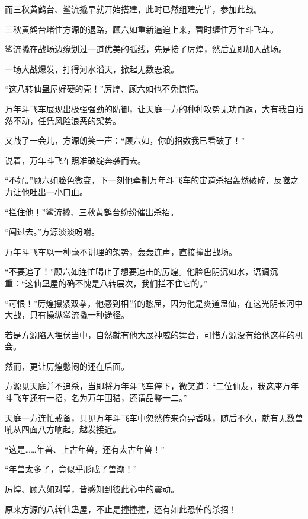 \begin{this_body}
而三秋黄鹤台、鲨流撬早就开始搭建，此时已然组建完毕，参加此战。

三秋黄鹤台堵住方源的退路，顾六如重新逼迫上来，暂时缠住万年斗飞车。

鲨流撬在战场边缘划过一道优美的弧线，先是接了厉煌，然后立即加入战场。

一场大战爆发，打得河水滔天，掀起无数恶浪。

“这八转仙蛊屋好硬的壳！”厉煌、顾六如也不免惊愕。

万年斗飞车展现出极强强劲的防御，让天庭一方的种种攻势无功而返，大有我自岿然不动，任凭风险浪恶的架势。

又战了一会儿，方源朗笑一声：“顾六如，你的招数我已看破了！”

说着，万年斗飞车照准破绽奔袭而去。

“不好。”顾六如脸色微变，下一刻他牵制万年斗飞车的宙道杀招轰然破碎，反噬之力让他吐出一小口血。

“拦住他！”鲨流撬、三秋黄鹤台纷纷催出杀招。

“闯过去。”方源淡淡吩咐。

万年斗飞车以一种毫不讲理的架势，轰轰连声，直接撞出战场。

“不要追了！”顾六如连忙喝止了想要追击的厉煌。他脸色阴沉如水，语调沉重：“这仙蛊屋的确不愧是八转层次，我们拦不住它的。”

“可恨！”厉煌攥紧双拳，他感到相当的憋屈，因为他是炎道蛊仙，在这光阴长河中大战，只有操纵鲨流撬一种途径。

若是方源陷入埋伏当中，自然就有他大展神威的舞台，可惜方源没有给他这样的机会。

然而，更让厉煌憋闷的还在后面。

方源见天庭并不追杀，当即将万年斗飞车停下，微笑道：“二位仙友，我这座万年斗飞车还有一招，名为万年围猎，还请品鉴一二。”

天庭一方连忙戒备，只见万年斗飞车中忽然传来奇异香味，随后不久，就有无数兽吼从四面八方响起，越发接近。

“这是……年兽、上古年兽，还有太古年兽！”

“年兽太多了，竟似乎形成了兽潮！”

厉煌、顾六如对望，皆感知到彼此心中的震动。

原来方源的八转仙蛊屋，不止是撞撞撞，还有如此恐怖的杀招！

\end{this_body}


